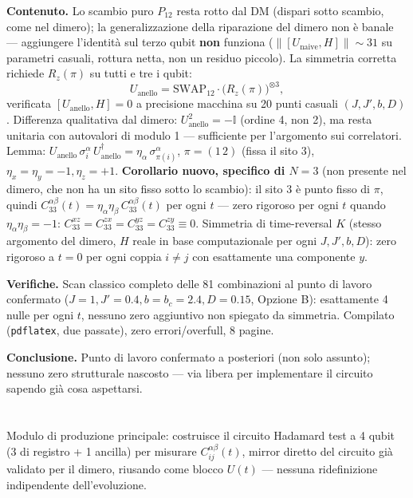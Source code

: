 \documentclass[11pt,a4paper]{article}
\begin{document}
\textbf{Contenuto.} Lo scambio puro $P_{12}$ resta rotto dal DM (dispari sotto
scambio, come nel dimero); la generalizzazione della riparazione del dimero non è
banale — aggiungere l'identità sul terzo qubit \textbf{non} funziona
($\|[U_\text{naive},H]\|\sim31$ su parametri casuali, rottura netta, non un
residuo piccolo). La simmetria corretta richiede $R_z(\pi)$ su tutti e tre i qubit:
$$U_\text{anello} = \mathrm{SWAP}_{12}\cdot\big(R_z(\pi)\big)^{\otimes 3},$$
verificata $[U_\text{anello},H]=0$ a precisione macchina su 20 punti casuali
$(J,J',b,D)$. Differenza qualitativa dal dimero: $U_\text{anello}^2=-\mathbb I$
(ordine 4, non 2), ma resta unitaria con autovalori di modulo 1 — sufficiente per
l'argomento sui correlatori. Lemma:
$U_\text{anello}\,\sigma_i^\alpha\,U_\text{anello}^\dagger=\eta_\alpha\,
\sigma_{\pi(i)}^\alpha$, $\pi=(1\,2)$ (fissa il sito 3), $\eta_x=\eta_y=-1,\eta_z=+1$.
\textbf{Corollario nuovo, specifico di $N=3$} (non presente nel dimero, che non ha
un sito fisso sotto lo scambio): il sito 3 è punto fisso di $\pi$, quindi
$C_{33}^{\alpha\beta}(t)=\eta_\alpha\eta_\beta\,C_{33}^{\alpha\beta}(t)$ per ogni
$t$ — zero rigoroso per ogni $t$ quando $\eta_\alpha\eta_\beta=-1$:
$C_{33}^{xz}=C_{33}^{zx}=C_{33}^{yz}=C_{33}^{zy}\equiv0$. Simmetria di
time-reversal $K$ (stesso argomento del dimero, $H$ reale in base computazionale
per ogni $J,J',b,D$): zero rigoroso a $t=0$ per ogni coppia $i\neq j$ con
esattamente una componente $y$.

\textbf{Verifiche.} Scan classico completo delle 81 combinazioni al punto di
lavoro confermato ($J{=}1,J'{=}0.4,b{=}b_c{=}2.4,D{=}0.15$, Opzione B): esattamente
4 nulle per ogni $t$, nessuno zero aggiuntivo non spiegato da simmetria. Compilato
(\texttt{pdflatex}, due passate), zero errori/overfull, 8 pagine.

\textbf{Conclusione.} Punto di lavoro confermato a posteriori (non solo assunto);
nessuno zero strutturale nascosto — via libera per implementare il circuito sapendo
già cosa aspettarsi.

\section*{\texttt{}}

Modulo di produzione principale: costruisce il circuito Hadamard test a 4 qubit (3
di registro + 1 ancilla) per misurare $C_{ij}^{\alpha\beta}(t)$, mirror diretto del
circuito già validato per il dimero, riusando
\texttt{} come blocco $U(t)$ — nessuna
ridefinizione indipendente dell'evoluzione.
\end{document}
